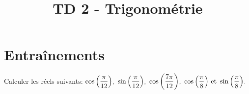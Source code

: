 \documentclass[a4paper, 11pt]{article}
\newcommand{\type}{TD }
\begin{document}
\title{\type  2 - Trigonométrie}


\section*{Entraînements}



\begin{exercice}  \;
Calculer les r\'eels suivants: $\cos{\left(\ddp\frac{\pi}{12}\right)},\ \sin{\left(\ddp\frac{\pi}{12}\right)},\ \cos{\left(\ddp\frac{7\pi}{12}\right)},\ \cos{\left(\ddp\frac{\pi}{8}\right)}\ \hbox{et}\ \sin{\left(\ddp\frac{\pi}{8}\right)} .$
\end{exercice}
\end{document}
